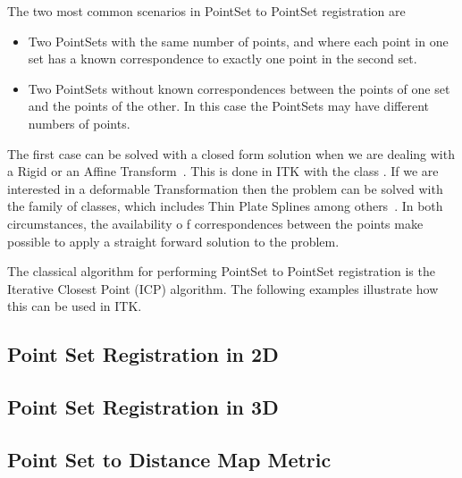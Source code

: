 The two most common scenarios in PointSet to PointSet registration are

\begin{itemize}
\item Two PointSets with the same number of points, and where each point in one
set has a known correspondence to exactly one point in the second set.
\item Two PointSets without known correspondences between the points of one set
and the points of the other. In this case the PointSets may have different
numbers of points.
\end{itemize}

The first case can be solved with a closed form solution when we are dealing
with a Rigid or an Affine Transform~\cite{Horn1987}. This is done in ITK with
the class . If we are interested in
a deformable Transformation then the problem can be solved with the
 family of classes, which includes Thin Plate Splines
among others~\cite{Rohr2001}. In both circumstances, the availability o f
correspondences between the points make possible to apply a straight forward
solution to the problem.


The classical algorithm for performing PointSet to PointSet registration is the
Iterative Closest Point (ICP) algorithm.  The following examples illustrate how
this can be used in ITK.



\subsection{Point Set Registration in 2D}
\label{sec:PointSetRegistrationIn2D}

\ifitkFullVersion

\fi




\subsection{Point Set Registration in 3D}
\label{sec:PointSetRegistrationIn3D}

\ifitkFullVersion

\fi



\subsection{Point Set to Distance Map Metric}
\label{sec:PointSetToDistanceMapMetric}

